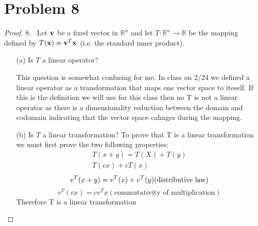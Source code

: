 \documentclass[12pt]{article}
\newcommand{\tab}{\\\\}
\newcommand{\sect}[1]{\section*{#1}}
\begin{document}
\sect{Problem 8}
\begin{proof}
  8.~ Let ${\bf v}$ be a fixed vector in ${\mathbb R}^n$ and let $T: {\mathbb R}^n \rightarrow {\mathbb R}$ be the mapping defined
  by $T({\bf x}) = {\bf v}^T {\bf x}$ (i.e. the standard inner product).
  \begin{itemize}
  \item[(a)] Is $T$ a linear operator?

  This question is somewhat confusing for me. In class on 2/24 we defined a linear operator as a transformation that maps one vector space to iteself. If this is the definition we will use for this class then no T is not a linear operator as there is a dimensionality reduction between the domain and codomain indicating that the vector space cahnges during the mapping.
  \item[(b)] Is $T$ a linear transformation?
  To prove that T is a linear transformation we must first prove the two following properties:
  \begin{align*}
    T(x+y)=T(X)+T(y)\\
    T(cx)+cT(x)
  \end{align*}
    \[
        v^T(x+y)=v^T(x)+v^T(y)\\ (\text{distributive law})
    \]
    \[
    v^T(cx)=cv^Tx (\text{commutativity of multiplication})
    \]
    Therefore T is a linear transformation
  \end{itemize}
  \vskip 10pt
  \noindent
\end{proof}\tab\tab
\end{document}

